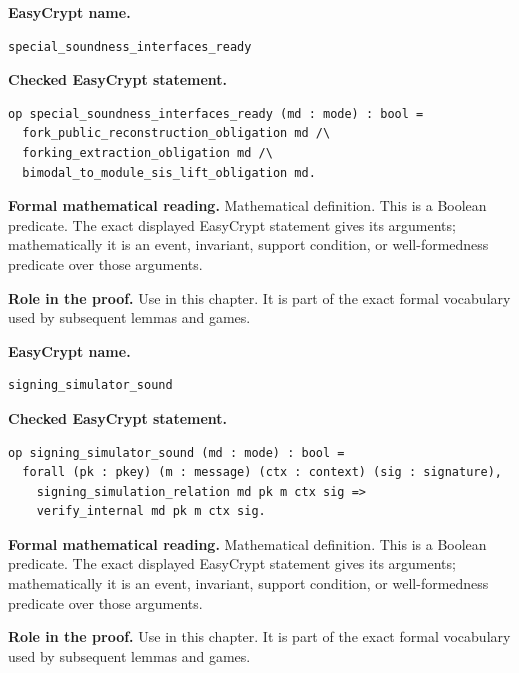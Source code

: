 \begin{formaldefinition}
\noindent\textbf{EasyCrypt name.}
\begin{lstlisting}[language=EasyCrypt,basicstyle=\ttfamily\scriptsize]
special_soundness_interfaces_ready
\end{lstlisting}
\noindent\textbf{Checked EasyCrypt statement.}
\begin{lstlisting}[language=EasyCrypt,basicstyle=\ttfamily\scriptsize]
op special_soundness_interfaces_ready (md : mode) : bool =
  fork_public_reconstruction_obligation md /\
  forking_extraction_obligation md /\
  bimodal_to_module_sis_lift_obligation md.
\end{lstlisting}
\noindent\textbf{Formal mathematical reading.}
Mathematical definition. This is a Boolean predicate.  The exact displayed EasyCrypt statement gives its arguments; mathematically it is an event, invariant, support condition, or well-formedness predicate over those arguments.

\noindent\textbf{Role in the proof.}
Use in this chapter. It is part of the exact formal vocabulary used by subsequent lemmas and games.

\end{formaldefinition}

\begin{formaldefinition}
\noindent\textbf{EasyCrypt name.}
\begin{lstlisting}[language=EasyCrypt,basicstyle=\ttfamily\scriptsize]
signing_simulator_sound
\end{lstlisting}
\noindent\textbf{Checked EasyCrypt statement.}
\begin{lstlisting}[language=EasyCrypt,basicstyle=\ttfamily\scriptsize]
op signing_simulator_sound (md : mode) : bool =
  forall (pk : pkey) (m : message) (ctx : context) (sig : signature),
    signing_simulation_relation md pk m ctx sig =>
    verify_internal md pk m ctx sig.
\end{lstlisting}
\noindent\textbf{Formal mathematical reading.}
Mathematical definition. This is a Boolean predicate.  The exact displayed EasyCrypt statement gives its arguments; mathematically it is an event, invariant, support condition, or well-formedness predicate over those arguments.

\noindent\textbf{Role in the proof.}
Use in this chapter. It is part of the exact formal vocabulary used by subsequent lemmas and games.

\end{formaldefinition}

